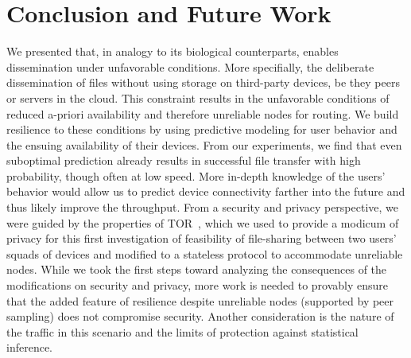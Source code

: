 \section{Conclusion and Future Work}%
\label{conclusion}

We presented \name that, in analogy to its biological
counterparts, enables dissemination under unfavorable conditions. More
specifially, the deliberate dissemination of files without using
storage on third-party devices, be they peers or servers in the
cloud. This constraint results in the unfavorable conditions of
reduced a-priori availability and therefore unreliable nodes for
routing. We build resilience to these conditions by using predictive
modeling for user behavior and the ensuing availability of their
devices. From our experiments, we find that even suboptimal prediction
already results in successful file transfer with high probability,
though often at low speed. More in-depth knowledge of the users'
behavior would allow us to predict device connectivity farther into
the future and thus likely improve the throughput. From a security and
privacy perspective, we were guided by the properties of
TOR~\cite{Tor}, which we used to provide a modicum of privacy for this
first investigation of feasibility of file-sharing between two users'
squads of devices and modified to a stateless protocol to
accommodate unreliable nodes. While we took the first steps toward
analyzing the consequences of the modifications on security and
privacy, more work is needed to provably ensure that the added feature
of resilience despite unreliable nodes (supported by peer sampling)
does 
not compromise security. Another
consideration is the nature of the traffic in this scenario and the
limits of protection against statistical inference. 

%


